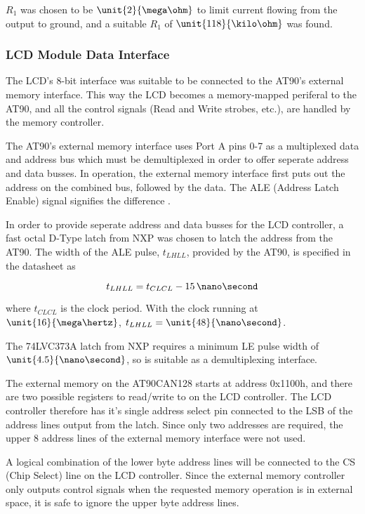  $R_{1}$ was chosen to be $\unit{2}{\mega\ohm}$ to limit current flowing from the output to ground, and a suitable $R_{1}$ of $\unit{118}{\kilo\ohm}$ was found.


\subsubsection{LCD Module Data Interface}

The LCD's 8-bit interface was suitable to be connected to the AT90's external memory interface. This way the LCD becomes a memory-mapped periferal to the AT90, and all the control signals (Read and Write strobes, etc.), are handled by the memory controller.

The AT90's external memory interface uses Port A pins 0-7 as a multiplexed data and address bus which must be demultiplexed in order to offer seperate address and data busses. In operation, the external memory interface first puts out the address on the combined bus, followed by the data. The ALE (Address Latch Enable) signal signifies the difference \cite{AT90CAN}.

In order to provide seperate address and data busses for the LCD controller, a fast octal D-Type latch from NXP was chosen to latch the address from the AT90. The width of the ALE pulse, $t_{LHLL}$, provided by the AT90, is specified in the datasheet as

\begin{equation}
t_{LHLL}=t_{CLCL}-15\, \nano\second
\end{equation}

 where $t_{CLCL}$ is the clock period. With the clock running at $\unit{16}{\mega\hertz}$, $t_{LHLL}=\unit{48}{\nano\second}$.

The 74LVC373A latch from NXP requires a minimum LE pulse width of $\unit{4.5}{\nano\second}$, so is suitable as a demultiplexing interface.

The external memory on the AT90CAN128 starts at address 0x1100h, and there are two possible registers to read/write to on the LCD controller. The LCD controller therefore has it's single address select pin connected to the LSB of the address lines output from the latch. Since only two addresses are required, the upper 8 address lines of the external memory interface were not used.

A logical combination of the lower byte address lines will be connected to the CS (Chip Select) line on the LCD controller. Since the external memory controller only outputs control signals when the requested memory operation is in external space, it is safe to ignore the upper byte address lines.

